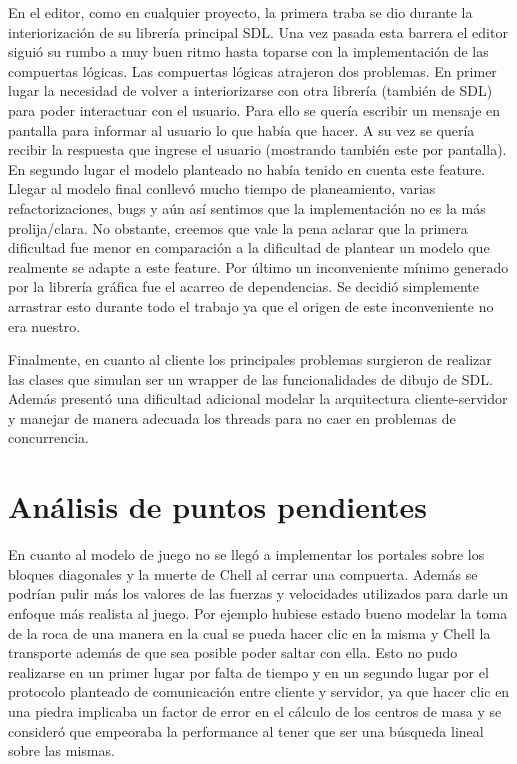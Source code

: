 \documentclass[a4paper]{article}
\begin{document}
En el editor, como en cualquier proyecto, la primera traba se dio durante la interiorización de su librería principal SDL. Una vez pasada esta barrera el editor siguió su rumbo a muy buen ritmo hasta toparse con la implementación de las compuertas lógicas.
Las compuertas lógicas atrajeron dos problemas. En primer lugar la necesidad de volver a interiorizarse con otra librería (también de SDL) para poder interactuar con el usuario. Para ello se quería escribir un mensaje en pantalla para informar al usuario lo que había que hacer. A su vez se quería recibir la respuesta que ingrese el usuario (mostrando también este por pantalla).  En segundo lugar el modelo planteado no había tenido en cuenta este feature. Llegar al modelo final conllevó mucho tiempo de planeamiento, varias refactorizaciones, bugs y aún así sentimos que la implementación no es la más prolija/clara. No obstante, creemos que vale la pena aclarar que la primera dificultad fue menor en comparación a la dificultad de plantear un modelo que realmente se adapte a este feature.
Por último un inconveniente mínimo generado por la librería gráfica fue el acarreo de dependencias. Se decidió simplemente arrastrar esto durante todo el trabajo ya que el origen de este inconveniente no era nuestro.

Finalmente, en cuanto al cliente los principales problemas surgieron de realizar las clases que simulan ser un wrapper de las funcionalidades de dibujo de SDL. Además presentó una dificultad adicional modelar la arquitectura cliente-servidor y manejar de manera adecuada los threads para no caer en problemas de concurrencia.


\section{Análisis de puntos pendientes}

En cuanto al modelo de juego no se llegó a implementar los portales sobre los bloques diagonales y la muerte de Chell al cerrar una compuerta. Además se podrían pulir más los valores de las fuerzas y velocidades utilizados para darle un enfoque más realista al juego. Por ejemplo hubiese estado bueno modelar la toma de la roca de una manera en la cual se pueda hacer clic en la misma y Chell la transporte además de que sea posible poder saltar con ella. Esto no pudo realizarse en un primer lugar por falta de tiempo y en un segundo lugar por el protocolo planteado de comunicación entre cliente y servidor, ya que hacer clic en una piedra implicaba un factor de error en el cálculo de los centros de masa y se consideró que empeoraba la performance al tener que ser una búsqueda lineal sobre las mismas. 
\end{document}
